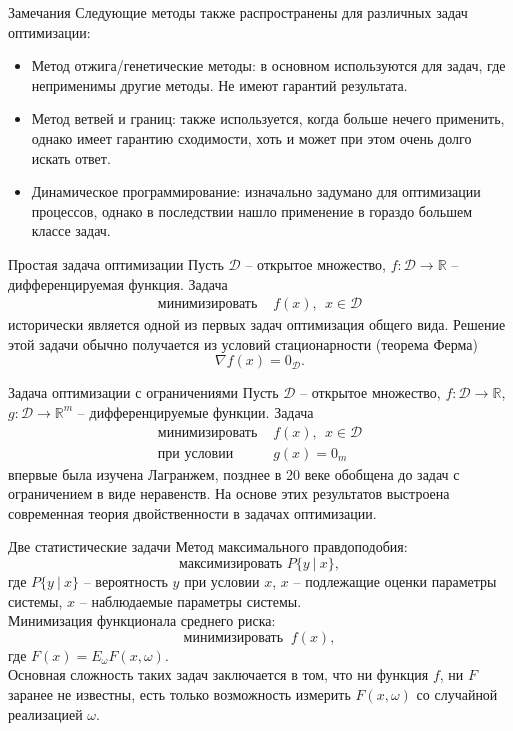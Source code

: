 \documentclass[10pt]{beamer}
\begin{document}
\begin{frame}{Замечания}
Следующие методы также распространены для различных задач оптимизации:
\pause
\begin{itemize}[<+->]
\item Метод отжига/генетические методы: в основном используются для задач, где неприменимы другие методы. Не имеют гарантий результата.
\item Метод ветвей и границ: также используется, когда больше нечего применить, однако имеет гарантию сходимости, хоть и может при этом очень долго искать ответ.
\item Динамическое программирование: изначально задумано для оптимизации процессов, однако в последствии нашло применение в гораздо большем классе задач.
\end{itemize}

\end{frame}

\begin{frame}{Простая задача оптимизации}
Пусть $\mathcal{D}$ -- открытое множество, $f:\mathcal{D}\rightarrow\mathbb{R}$ -- дифференцируемая функция. \pause Задача
$$
\begin{array}{ll}
\mbox{минимизировать } & f(x),~~x\in \mathcal{D}
\end{array}
$$
исторически является одной из первых задач оптимизация общего вида. Решение этой задачи обычно получается из условий стационарности (теорема Ферма)
$$
\nabla f(x) = 0_\mathcal{D}.
$$
\end{frame}


\begin{frame}{Задача оптимизации с ограничениями}
Пусть $\mathcal{D}$ -- открытое множество, $f:\mathcal{D}\rightarrow\mathbb{R}$, $g:\mathcal{D}\rightarrow \mathbb{R}^m$ -- дифференцируемые функции.
\pause Задача
$$
\begin{array}{ll}
\mbox{минимизировать } & f(x),~~x\in \mathcal{D}\\
\mbox{при условии } & g(x)= 0_m
\end{array}
$$
впервые была изучена Лагранжем, позднее в 20 веке обобщена до задач с ограничением в виде неравенств. На основе этих результатов выстроена современная теория двойственности в задачах оптимизации.
\end{frame}

\begin{frame}{Две статистические задачи}
Метод максимального правдоподобия:
$$
\mbox{максимизировать } P\{y~|~x\},
$$
где $P\{y~|~x\}$ -- вероятность $y$ при условии $x$, $x$ -- подлежащие оценки параметры системы, $x$ -- наблюдаемые параметры системы.\\
\pause
\vspace{1em}
Минимизация функционала среднего риска:
$$
\mbox{минимизировать } ~ f(x),
$$
где $F(x)=E_\omega F(x, \omega)$.\\
\pause
\vspace{1em}
Основная сложность таких задач заключается в том, что ни функция $f$, ни $F$ заранее не известны, есть только возможность измерить $F(x, \omega)$ со случайной реализацией $\omega$.
\end{frame}
\end{document}
